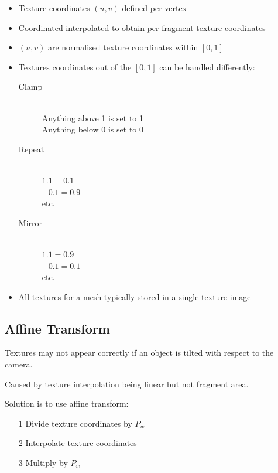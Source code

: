 \documentclass[a4paper]{article}
\begin{document}
\begin{itemize}
  \item
    Texture coordinates $(u, v)$ defined per vertex

  \item
    Coordinated interpolated to obtain per fragment texture coordinates

  \item
    $(u, v)$ are normalised texture coordinates within $[0, 1]$

  \item
    Textures coordinates out of the $[0, 1]$ can be handled differently:

    \begin{description}
      \item[Clamp] \hfill \\
        Anything above 1 is set to 1 \\
        Anything below 0 is set to 0

      \item[Repeat] \hfill \\
        $1.1 = 0.1$ \\
        $-0.1 = 0.9$ \\
        etc.

      \item[Mirror] \hfill \\
        $1.1 = 0.9$ \\
        $-0.1 = 0.1$ \\
        etc.

    \end{description}

  \item
    All textures for a mesh typically stored in a single texture image

\end{itemize}

\subsection{Affine Transform}

Textures may not appear correctly if an object is tilted with respect to the
camera.

Caused by texture interpolation being linear but not fragment area.

Solution is to use affine transform:

\begin{enumerate}
  \item[1] Divide texture coordinates by $P_{w}$
  \item[2] Interpolate texture coordinates
  \item[3] Multiply by $P_{w}$
\end{enumerate}
\end{document}
